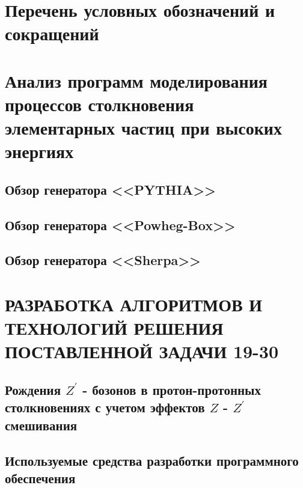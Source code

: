 \documentclass[12pt,a4paper]{styles/report}
\begin{document}
	
\renewcommand\contentsname{СОДЕРЖАНИЕ}
\renewcommand{\bibname}{БИБЛИОГРАФИЧЕСКИЙ СПИСОК}
\renewcommand\chaptername{ГЛАВА}
\renewcommand\figurename{Рисунок}
\renewcommand\tablename{Таблица}



\newpage
\pagestyle{plain}  \setcounter{page}{2}
\large \tableofcontents

\newpage
\chapter*{Перечень условных обозначений и сокращений}






\chapter{Анализ программ моделирования процессов столкновения элементарных частиц при высоких энергиях}

\section{Обзор генератора <<PYTHIA>>}

\section{Обзор генератора <<Powheg-Box>>}

\section{Обзор генератора <<Sherpa>>}


\chapter{РАЗРАБОТКА АЛГОРИТМОВ И ТЕХНОЛОГИЙ РЕШЕНИЯ ПОСТАВЛЕННОЙ ЗАДАЧИ 19-30}
\section{Рождения $Z^\prime$ - бозонов в протон-протонных столкновениях с учетом эффектов $Z$ - $Z^\prime$ смешивания}


\section{Используемые средства разработки программного обеспечения}

\end{document}
